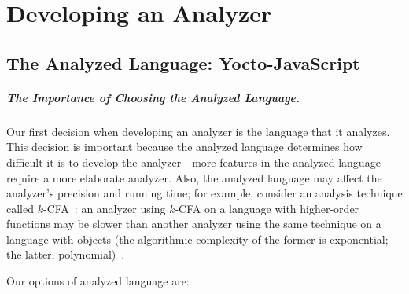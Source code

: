 \documentclass[12pt, oneside]{book}
\begin{document}
\chapter{Developing an Analyzer}


\section{The Analyzed Language: Yocto-JavaScript}

\paragraph{The Importance of Choosing the Analyzed Language.}

Our first decision when developing an analyzer is the language that it analyzes. This decision is important because the analyzed language determines how difficult it is to develop the analyzer—more features in the analyzed language require a more elaborate analyzer. Also, the analyzed language may affect the analyzer’s precision and running time; for example, consider an analysis technique called \(k\)-CFA~\cite{k-cfa}: an analyzer using \(k\)-CFA on a language with higher-order functions may be slower than another analyzer using the same technique on a language with objects (the algorithmic complexity of the former is exponential; the latter, polynomial)~\cite{m-cfa}.

Our options of analyzed language are:
\end{document}
